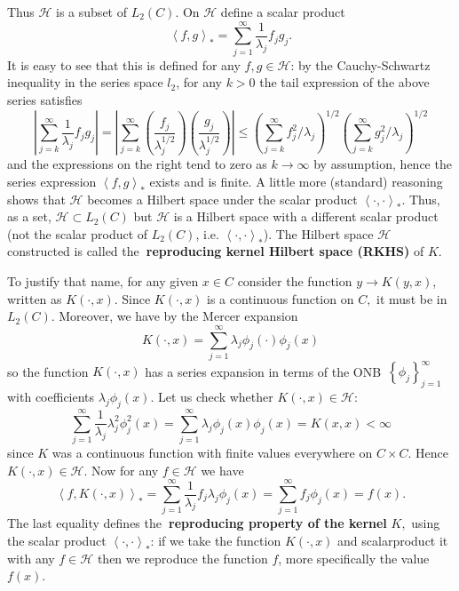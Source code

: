 \documentclass[11pt,twoside]{article}%
\theoremstyle{change}
\begin{document}
Thus $\mathcal{H}$ is a subset of $L_{2}(C)$. On $\mathcal{H}$ define a scalar
product
\[
\left\langle f,g\right\rangle _{\ast}=\sum_{j=1}^{\infty}\frac{1}{\lambda_{j}%
}f_{j}g_{j}.
\]
It is easy to see that this is defined for any $f,g\in\mathcal{H}$: by the
Cauchy-Schwartz inequality in the series space $l_{2}$, for any $k>0$ the tail
expression of the above series satisfies
\[
\left\vert \sum_{j=k}^{\infty}\frac{1}{\lambda_{j}}f_{j}g_{j}\right\vert
=\left\vert \sum_{j=k}^{\infty}\left(  \frac{f_{j}}{\lambda_{j}^{1/2}}\right)
\left(  \frac{g_{j}}{\lambda_{j}^{1/2}}\right)  \right\vert \leq\left(
\sum_{j=k}^{\infty}f_{j}^{2}/\lambda_{j}\right)  ^{1/2}\left(  \sum
_{j=k}^{\infty}g_{j}^{2}/\lambda_{j}\right)  ^{1/2}%
\]
and the expressions on the right tend to zero as $k\rightarrow\infty$ by
assumption, hence the series expression $\left\langle f,g\right\rangle _{\ast
}$ exists and is finite. A little more (standard) reasoning shows that
$\mathcal{H}$ becomes a Hilbert space under the scalar product $\left\langle
\cdot,\cdot\right\rangle _{\ast}$. Thus, as a set, $\mathcal{H\subset}%
L_{2}(C)$ but $\mathcal{H}$ is a Hilbert space with a different scalar product
(not the scalar product of $L_{2}(C)$, i.e. $\left\langle \cdot,\cdot
\right\rangle _{\ast}$). The Hilbert space $\mathcal{H}$ constructed is called
the\textbf{\ reproducing kernel Hilbert space (RKHS)} of $K.$

To justify that name, for any given $x\in C$ consider the function
$y\rightarrow K(y,x)$, written as $K(\cdot,x)$. Since $K(\cdot,x)$ is a
continuous function on $C,$ it must be in $L_{2}(C)$. Moreover, we have by the
Mercer expansion
\[
K(\cdot,x)=\sum_{j=1}^{\infty}\lambda_{j}\phi_{j}(\cdot)\phi_{j}(x)
\]
so the function $K(\cdot,x)$ has a series expansion in terms of the
ONB\ $\left\{  \phi_{j}\right\}  _{j=1}^{\infty}$ with coefficients
$\lambda_{j}\phi_{j}(x)$. Let us check whether $K(\cdot,x)\in\mathcal{H}$:%
\[
\sum_{j=1}^{\infty}\frac{1}{\lambda_{j}}\lambda_{j}^{2}\phi_{j}^{2}%
(x)=\sum_{j=1}^{\infty}\lambda_{j}\phi_{j}(x)\phi_{j}(x)=K(x,x)<\infty
\]
since $K$ was a continuous function with finite values everywhere on $C\times
C$. Hence $K(\cdot,x)\in\mathcal{H}$. Now for any $f\in\mathcal{H} $ we have
\begin{equation}
\left\langle f,K(\cdot,x)\right\rangle _{\ast}=\sum_{j=1}^{\infty}\frac
{1}{\lambda_{j}}f_{j}\lambda_{j}\phi_{j}(x)=\sum_{j=1}^{\infty}f_{j}\phi
_{j}(x)=f(x).\label{repro-prop}%
\end{equation}
The last equality defines the\textbf{\ reproducing property of the kernel}
$K,$ using the scalar product $\left\langle \cdot,\cdot\right\rangle _{\ast}$:
if we take the function $K(\cdot,x)$ and scalarproduct it with any
$f\in\mathcal{H}$ then we reproduce the function $f$, more specifically the
value $f(x)$.
\end{document}
